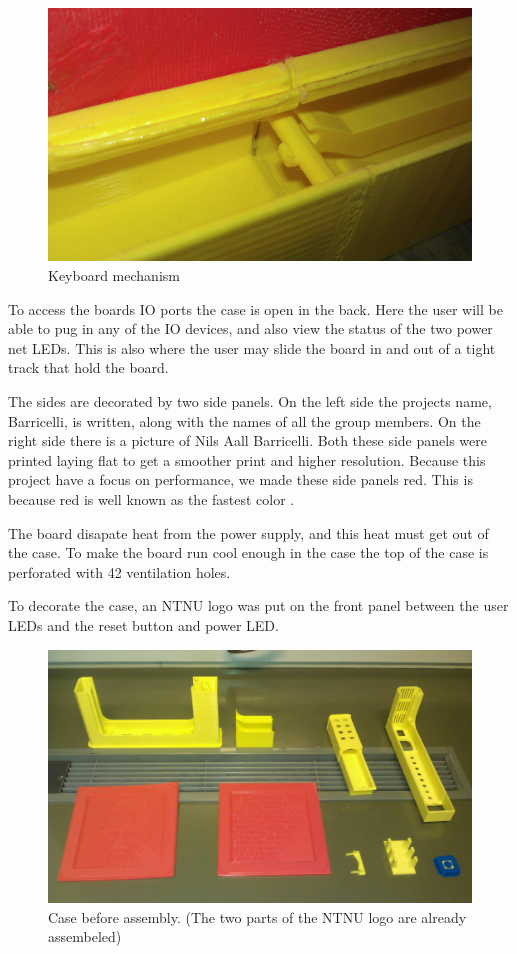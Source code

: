 \begin{figure}[H]
\includegraphics[width=\textwidth,keepaspectratio,clip]{additional-components/keyboard-mechanism.jpg}%
\caption{Keyboard mechanism}
\end{figure}

To access the boards IO ports the case is open in the back.
Here the user will be able to pug in any of the IO devices, and also view the status of the two power net LEDs.
This is also where the user may slide the board in and out of a tight track that hold the board.

The sides are decorated by two side panels.
On the left side the projects name, Barricelli, is written, along with the names of all the group members.
On the right side there is a picture of Nils Aall Barricelli.
Both these side panels were printed laying flat to get a smoother print and higher resolution.
Because this project have a focus on performance, we made these side panels red.
This is because red is well known as the fastest color \cite{red-is-the-fastest-color}.

The board disapate heat from the power supply, and this heat must get out of the case.
To make the board run cool enough in the case the top of the case is perforated with 42 ventilation holes.

To decorate the case, an NTNU logo was put on the front panel between the user LEDs and the reset button and power LED.

\begin{figure}[H]
\includegraphics[width=\textwidth,keepaspectratio,clip]{additional-components/case-parts.jpg}%
\caption{Case before assembly. (The two parts of the NTNU logo are already assembeled)}
\end{figure}

